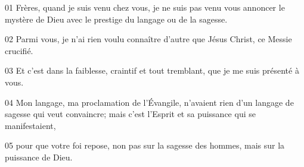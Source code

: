 01 Frères, quand je suis venu chez vous, je ne suis pas venu vous annoncer le mystère de Dieu avec le prestige du langage ou de la sagesse.

02 Parmi vous, je n’ai rien voulu connaître d’autre que Jésus Christ, ce Messie crucifié.

03 Et c’est dans la faiblesse, craintif et tout tremblant, que je me suis présenté à vous.

04 Mon langage, ma proclamation de l’Évangile, n’avaient rien d’un langage de sagesse qui veut convaincre; mais c’est l’Esprit et sa puissance qui se manifestaient,

05 pour que votre foi repose, non pas sur la sagesse des hommes, mais sur la puissance de Dieu.
